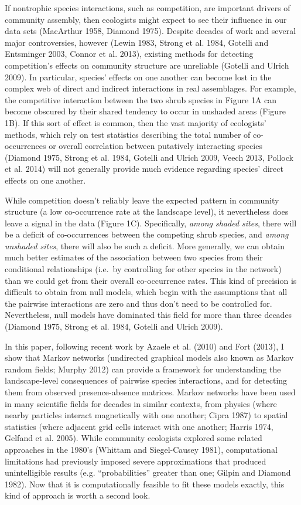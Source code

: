 \documentclass[12pt,]{article}
\begin{document}
\begin{spacing}{1.9}
\begin{flushleft}
If nontrophic species interactions, such as competition, are important
drivers of community assembly, then ecologists might expect to see their
influence in our data sets (MacArthur 1958, Diamond 1975). Despite
decades of work and several major controversies, however (Lewin 1983,
Strong et al. 1984, Gotelli and Entsminger 2003, Connor et al. 2013),
existing methods for detecting competition's effects on community
structure are unreliable (Gotelli and Ulrich 2009). In particular,
species' effects on one another can become lost in the complex web of
direct and indirect interactions in real assemblages. For example, the
competitive interaction between the two shrub species in Figure 1A can
become obscured by their shared tendency to occur in unshaded areas
(Figure 1B). If this sort of effect is common, then the vast majority of
ecologists' methods, which rely on test statistics describing the total
number of co-occurrences or overall correlation between putatively
interacting species (Diamond 1975, Strong et al. 1984, Gotelli and
Ulrich 2009, Veech 2013, Pollock et al. 2014) will not generally provide
much evidence regarding species' direct effects on one another.

While competition doesn't reliably leave the expected pattern in
community structure (a low co-occurrence rate at the landscape level),
it nevertheless does leave a signal in the data (Figure 1C).
Specifically, \emph{among shaded sites}, there will be a deficit of
co-occurrences between the competing shrub species, and \emph{among
unshaded sites}, there will also be such a deficit. More generally, we
can obtain much better estimates of the association between two species
from their conditional relationships (i.e.~by controlling for other
species in the network) than we could get from their overall
co-occurrence rates. This kind of precision is difficult to obtain from
null models, which begin with the assumptions that all the pairwise
interactions are zero and thus don't need to be controlled for.
Nevertheless, null models have dominated this field for more than three
decades (Diamond 1975, Strong et al. 1984, Gotelli and Ulrich 2009).

In this paper, following recent work by Azaele et al. (2010) and Fort
(2013), I show that Markov networks (undirected graphical models also
known as Markov random fields; Murphy 2012) can provide a framework for
understanding the landscape-level consequences of pairwise species
interactions, and for detecting them from observed presence-absence
matrices. Markov networks have been used in many scientific fields for
decades in similar contexts, from physics (where nearby particles
interact magnetically with one another; Cipra 1987) to spatial
statistics (where adjacent grid cells interact with one another; Harris
1974, Gelfand et al. 2005). While community ecologists explored some
related approaches in the 1980's (Whittam and Siegel-Causey 1981),
computational limitations had previously imposed severe approximations
that produced unintelligible results (e.g. ``probabilities'' greater
than one; Gilpin and Diamond 1982). Now that it is computationally
feasible to fit these models exactly, this kind of approach is worth a
second look.


\end{flushleft}
\end{spacing}
\end{document}
